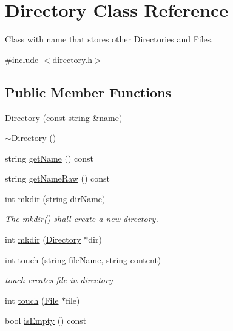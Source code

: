 \hypertarget{class_directory}{}\section{Directory Class Reference}
\label{class_directory}


Class with name that stores other Directories and Files.  




{\ttfamily \#include $<$directory.\+h$>$}

\subsection*{Public Member Functions}
\begin{DoxyCompactItemize}
\item 
\hyperlink{class_directory_a0b019225671a50ead8dbb22b97667676}{Directory} (const string \&name)
\item 
\hyperlink{class_directory_affbde8714685c61601421097d621341d}{$\sim$\+Directory} ()
\item 
string \hyperlink{class_directory_adfb3c1b9b65ca47aaef4c91fb44adf83}{get\+Name} () const
\item 
string \hyperlink{class_directory_ac9641eabb49e810239d66bcc99bb8e98}{get\+Name\+Raw} () const
\item 
int \hyperlink{class_directory_adfec0eb4ee88844c1483363b14543e92}{mkdir} (string dir\+Name)
\begin{DoxyCompactList}\small\item\em The \hyperlink{class_directory_adfec0eb4ee88844c1483363b14543e92}{mkdir()} shall create a new directory. \end{DoxyCompactList}\item 
int \hyperlink{class_directory_a02a77fbbfda041d430ec4d6f78ba8618}{mkdir} (\hyperlink{class_directory}{Directory} $\ast$dir)
\item 
int \hyperlink{class_directory_abe82fee2bf7d59d277133848d8c9833d}{touch} (string file\+Name, string content)
\begin{DoxyCompactList}\small\item\em touch creates file in directory \end{DoxyCompactList}\item 
int \hyperlink{class_directory_ab78fbd1a38c3e9f3926372f9fb2ccf5e}{touch} (\hyperlink{class_file}{File} $\ast$file)
\item 
bool \hyperlink{class_directory_a5d3efa22fedc9f37963b2217e60beb3c}{is\+Empty} () const

\end{DoxyCompactItemize}
